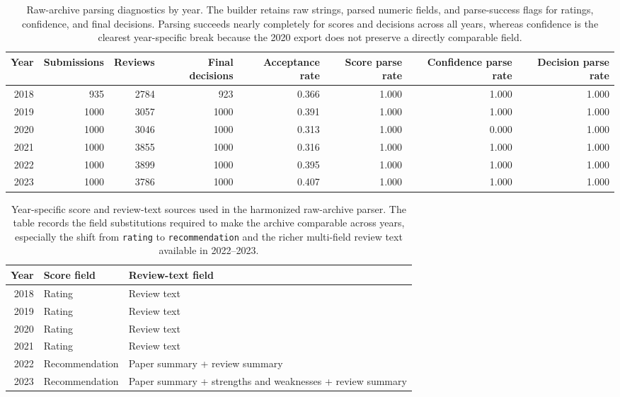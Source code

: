 \begin{table}[!htbp]
\centering
\begingroup
\scriptsize
\renewcommand{\arraystretch}{1.20}
\setlength{\tabcolsep}{6pt}
\caption{Raw-archive parsing diagnostics by year. The builder retains raw strings, parsed numeric fields, and parse-success flags for ratings, confidence, and final decisions. Parsing succeeds nearly completely for scores and decisions across all years, whereas confidence is the clearest year-specific break because the 2020 export does not preserve a directly comparable field.}
\label{tab:app:harmonization}
\begin{tabular}{rrrrrrrr}
\toprule
Year & Submissions & Reviews & Final decisions & Acceptance rate & Score parse rate & Confidence parse rate & Decision parse rate \\
\midrule
2018 & 935 & 2784 & 923 & 0.366 & 1.000 & 1.000 & 1.000 \\
2019 & 1000 & 3057 & 1000 & 0.391 & 1.000 & 1.000 & 1.000 \\
2020 & 1000 & 3046 & 1000 & 0.313 & 1.000 & 0.000 & 1.000 \\
2021 & 1000 & 3855 & 1000 & 0.316 & 1.000 & 1.000 & 1.000 \\
2022 & 1000 & 3899 & 1000 & 0.395 & 1.000 & 1.000 & 1.000 \\
2023 & 1000 & 3786 & 1000 & 0.407 & 1.000 & 1.000 & 1.000 \\
\bottomrule
\end{tabular}
\endgroup
\end{table}

\begin{table}[!htbp]
\centering
\begingroup
\normalsize
\renewcommand{\arraystretch}{1.20}
\setlength{\tabcolsep}{6pt}
\caption{Year-specific score and review-text sources used in the harmonized raw-archive parser. The table records the field substitutions required to make the archive comparable across years, especially the shift from \texttt{rating} to \texttt{recommendation} and the richer multi-field review text available in 2022--2023.}
\label{tab:app:fieldmap}
\begin{tabular}{rll}
\toprule
Year & Score field & Review-text field \\
\midrule
2018 & Rating & Review text \\
2019 & Rating & Review text \\
2020 & Rating & Review text \\
2021 & Rating & Review text \\
2022 & Recommendation & Paper summary + review summary \\
2023 & Recommendation & Paper summary + strengths and weaknesses + review summary \\
\bottomrule
\end{tabular}
\endgroup
\end{table}

